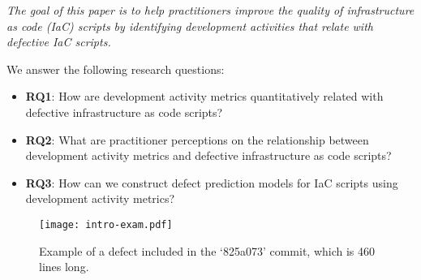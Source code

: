 \documentclass[smallextended]{svjour3}       %
\begin{document}

\textit{The goal of this paper is to help practitioners improve the quality of infrastructure as code (IaC) scripts by identifying development activities that relate with defective IaC scripts.}

We answer the following research questions: 

\begin{itemize} 

\item{\textbf{RQ1}: How are development activity metrics quantitatively related with defective infrastructure as code scripts? }

\item{\textbf{RQ2}: What are practitioner perceptions on the relationship between development activity metrics and defective infrastructure as code scripts? }

\item{\textbf{RQ3}: How can we construct defect prediction models for IaC scripts using development activity metrics?}

\end{itemize}



\begin{figure}[t]
\centering
\texttt{[image: intro-exam.pdf]}
\caption{Example of a defect included in the `825a073' commit, which is 460 lines long. }
\label{fig-intro}
\end{figure}  
\end{document}
